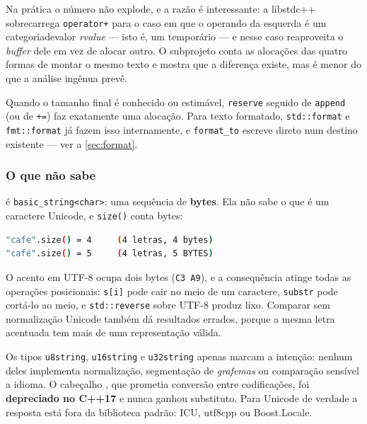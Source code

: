 Na prática o número não explode, e a razão é interessante: a libstdc++
sobrecarrega \texttt{operator+} para o caso em que o operando da esquerda é um
\gls{categoriadevalor} \emph{rvalue} --- isto é, um temporário --- e nesse caso
reaproveita o \emph{buffer} dele em vez de alocar outro. O subprojeto conta as
alocações das quatro formas de montar o mesmo texto e mostra que a diferença
existe, mas é menor do que a análise ingênua prevê.

\begin{regra}
Quando o tamanho final é conhecido ou estimável, \texttt{reserve} seguido de
\texttt{append} (ou de \texttt{+=}) faz exatamente uma alocação. Para texto
formatado, \texttt{std::format} e \texttt{fmt::format} já fazem isso
internamente, e \texttt{format\_to} escreve direto num destino existente ---
ver a \cref{sec:format}.
\end{regra}

\subsubsection{O que  não sabe}

 é \texttt{basic\_string<char>}: uma sequência de
\textbf{bytes}. Ela não sabe o que é um caractere Unicode, e \texttt{size()}
conta bytes:

\begin{lstlisting}[style=bt, language=bash,
    caption={Saída de \texttt{src/strings/}: bytes não são letras.}]
"cafe".size() = 4     (4 letras, 4 bytes)
"café".size() = 5     (4 letras, 5 BYTES)
\end{lstlisting}

O acento em UTF-8 ocupa dois bytes (\texttt{C3~A9}), e a consequência atinge
todas as operações posicionais: \texttt{s[i]} pode cair no meio de um caractere,
\texttt{substr} pode cortá-lo ao meio, e \texttt{std::reverse} sobre UTF-8
produz lixo. Comparar sem normalização Unicode também dá resultados errados,
porque a mesma letra acentuada tem mais de uma representação válida.

\begin{armadilha}
Os tipos \texttt{u8string}, \texttt{u16string} e \texttt{u32string} apenas
marcam a intenção: nenhum deles implementa normalização, segmentação de
\emph{grafemas} ou comparação sensível a idioma. O cabeçalho
, que prometia conversão entre codificações, foi
\textbf{depreciado no C++17} e nunca ganhou substituto. Para Unicode de verdade
a resposta está fora da biblioteca padrão: ICU, utf8cpp ou Boost.Locale.
\end{armadilha}

